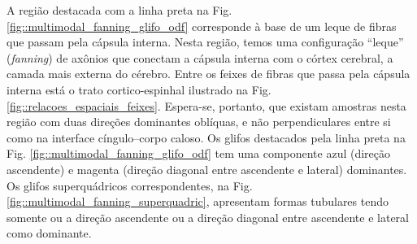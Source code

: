 A região destacada com a linha preta na Fig. \ref{fig::multimodal_fanning_glifo_odf} corresponde à base de um leque de fibras que passam pela cápsula interna. Nesta região, temos uma configuração ``leque'' (\textit{fanning}) de axônios que conectam a cápsula interna com o córtex cerebral, a camada mais externa do cérebro. Entre os feixes de fibras que passa pela cápsula interna está o trato cortico-espinhal ilustrado na Fig. \ref{fig::relacoes_espaciais_feixes}. Espera-se, portanto, que existam amostras nesta região com duas direções dominantes oblíquas, e não perpendiculares entre si como na interface cíngulo--corpo caloso. Os glifos destacados pela linha preta na Fig. \ref{fig::multimodal_fanning_glifo_odf} tem uma componente azul (direção ascendente) e magenta (direção diagonal entre ascendente e lateral) dominantes. Os glifos superquádricos correspondentes, na Fig. \ref{fig::multimodal_fanning_superquadric}, apresentam formas tubulares tendo somente ou a direção ascendente ou a direção diagonal entre ascendente e lateral como dominante. %

